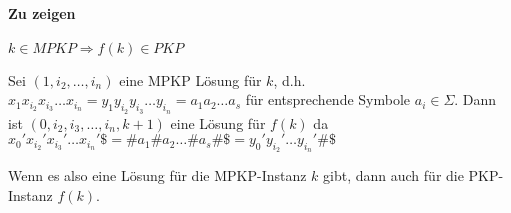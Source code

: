 \paragraph*{Zu zeigen} $k \in MPKP \Rightarrow f(k) \in PKP$

Sei $(1,i_2,\dots,i_n)$ eine MPKP Lösung für $k$, d.h. $x_1 x_{i_2} x_{i_3} \dots x_{i_n} = y_1 y_{i_2} y_{i_3} \dots y_{i_n} = a_1 a_2 \dots a_s$ für entsprechende Symbole $a_i \in \Sigma$. Dann ist $(0,i_2,i_3,\dots,i_n,k+1)$ eine Lösung für $f(k)$ da $x_0' x_{i_2}' x_{i_3}' \dots x_{i_n}'\$ = \#a_1\#a_2 \dots \#a_s\#\$ = y_0' y_{i_2}' \dots y_{i_n}'\#\$$

\par\medskip Wenn es also eine Lösung für die MPKP-Instanz $k$ gibt, dann auch für die PKP-Instanz $f(k)$.